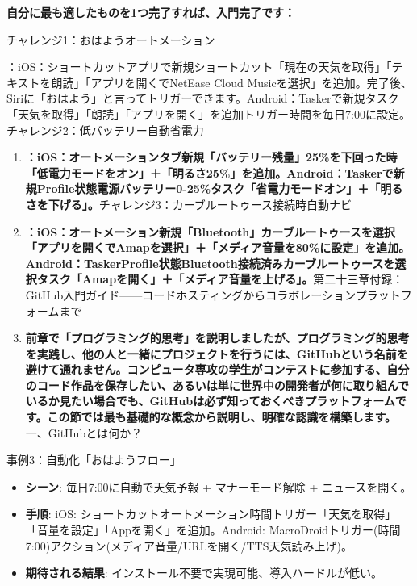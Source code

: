 \textbf{自分に最も適したものを1つ完了すれば、入門完了です：}\par

チャレンジ1：おはようオートメーション

\begin{tcbpractice}{：iOS：ショートカットアプリで新規ショートカット「現在の天気を取得」「テキストを朗読」「アプリを開くでNetEase Cloud Musicを選択」を追加。完了後、Siriに「おはよう」と言ってトリガーできます。Android：Taskerで新規タスク「天気を取得」「朗読」「アプリを開く」を追加トリガー時間を毎日7:00に設定。}
チャレンジ2：低バッテリー自動省電力

\begin{enumerate}
  \item \textbf{：iOS：オートメーションタブ新規「バッテリー残量」25\%を下回った時「低電力モードをオン」＋「明るさ25\%」を追加。Android：Taskerで新規Profile状態電源バッテリー0-25\%タスク「省電力モードオン」＋「明るさを下げる」。}チャレンジ3：カーブルートゥース接続時自動ナビ
  \item \textbf{：iOS：オートメーション新規「Bluetooth」カーブルートゥースを選択「アプリを開くでAmapを選択」＋「メディア音量を80\%に設定」を追加。Android：TaskerProfile状態Bluetooth接続済みカーブルートゥースを選択タスク「Amapを開く」＋「メディア音量を上げる」。}第二十三章付録：GitHub入門ガイド——コードホスティングからコラボレーションプラットフォームまで
  \item \textbf{前章で「プログラミング的思考」を説明しましたが、プログラミング的思考を実践し、他の人と一緒にプロジェクトを行うには、GitHubという名前を避けて通れません。コンピュータ専攻の学生がコンテストに参加する、自分のコード作品を保存したい、あるいは単に世界中の開発者が何に取り組んでいるか見たい場合でも、GitHubは必ず知っておくべきプラットフォームです。この節では最も基礎的な概念から説明し、明確な認識を構築します。}一、GitHubとは何か？
\end{enumerate}

\end{tcbpractice}

\begin{tcbinfo}{事例3：自動化「おはようフロー」}
\begin{itemize}
  \item \textbf{シーン}: 毎日7:00に自動で天気予報 + マナーモード解除 + ニュースを開く。
  \item \textbf{手順}: iOS: ショートカットオートメーション時間トリガー「天気を取得」「音量を設定」「Appを開く」を追加。Android: MacroDroidトリガー(時間 7:00)アクション(メディア音量/URLを開く/TTS天気読み上げ)。
  \item \textbf{期待される結果}: インストール不要で実現可能、導入ハードルが低い。
\end{itemize}

\end{tcbinfo}
